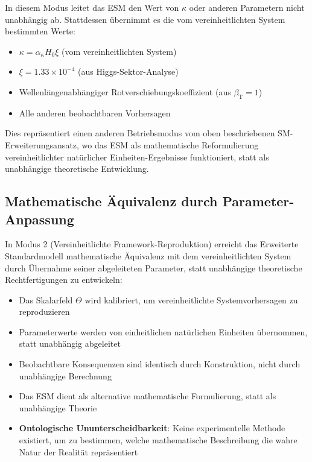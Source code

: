 \documentclass[12pt,a4paper]{article}
\newcommand{\betaT}{\beta_{\text{T}}}
\newcommand{\xipar}{\xi}
\begin{document}
	In diesem Modus leitet das ESM den Wert von $\kappa$ oder anderen Parametern nicht unabhängig ab. Stattdessen übernimmt es die vom vereinheitlichten System bestimmten Werte:
	
	\begin{itemize}
		\item $\kappa = \alpha_\kappa H_0 \xipar$ (vom vereinheitlichten System)
		\item $\xipar = 1.33 \times 10^{-4}$ (aus Higgs-Sektor-Analyse)
		\item Wellenlängenabhängiger Rotverschiebungskoeffizient (aus $\betaT = 1$)
		\item Alle anderen beobachtbaren Vorhersagen
	\end{itemize}
	
	Dies repräsentiert einen anderen Betriebsmodus vom oben beschriebenen SM-Erweiterungsansatz, wo das ESM als mathematische Reformulierung vereinheitlichter natürlicher Einheiten-Ergebnisse funktioniert, statt als unabhängige theoretische Entwicklung.
	
	\subsection{Mathematische Äquivalenz durch Parameter-Anpassung}
	\label{subsec:mathematical_equivalence_parameters}
	
	In Modus 2 (Vereinheitlichte Framework-Reproduktion) erreicht das Erweiterte Standardmodell mathematische Äquivalenz mit dem vereinheitlichten System durch Übernahme seiner abgeleiteten Parameter, statt unabhängige theoretische Rechtfertigungen zu entwickeln:
	
	\begin{itemize}
		\item Das Skalarfeld $\Theta$ wird kalibriert, um vereinheitlichte Systemvorhersagen zu reproduzieren
		\item Parameterwerte werden von einheitlichen natürlichen Einheiten übernommen, statt unabhängig abgeleitet
		\item Beobachtbare Konsequenzen sind identisch durch Konstruktion, nicht durch unabhängige Berechnung
		\item Das ESM dient als alternative mathematische Formulierung, statt als unabhängige Theorie
		\item \textbf{Ontologische Ununterscheidbarkeit}: Keine experimentelle Methode existiert, um zu bestimmen, welche mathematische Beschreibung die wahre Natur der Realität repräsentiert
	\end{itemize}
	
\end{document}
